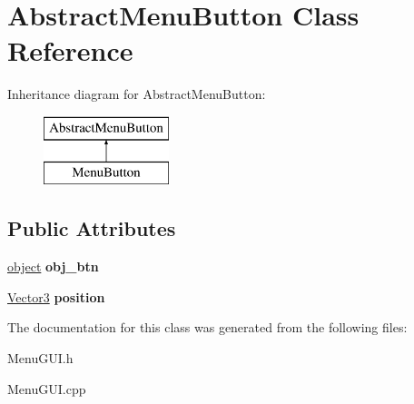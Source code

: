 \hypertarget{class_abstract_menu_button}{\section{Abstract\-Menu\-Button Class Reference}
\label{class_abstract_menu_button}
}
Inheritance diagram for Abstract\-Menu\-Button\-:\begin{figure}[H]
\begin{center}
\leavevmode
\includegraphics[height=2.000000cm]{class_abstract_menu_button}
\end{center}
\end{figure}
\subsection*{Public Attributes}
\begin{DoxyCompactItemize}
\item 
\hypertarget{class_abstract_menu_button_ad1498e6383f0884ac96b0a76cfeee31a}{\hyperlink{structobject}{object} {\bfseries obj\-\_\-btn}}\label{class_abstract_menu_button_ad1498e6383f0884ac96b0a76cfeee31a}

\item 
\hypertarget{class_abstract_menu_button_a86e619f395f94d346bd08b31e234ceb1}{\hyperlink{struct_vector3}{Vector3} {\bfseries position}}\label{class_abstract_menu_button_a86e619f395f94d346bd08b31e234ceb1}

\end{DoxyCompactItemize}


The documentation for this class was generated from the following files\-:\begin{DoxyCompactItemize}
\item 
Menu\-G\-U\-I.\-h\item 
Menu\-G\-U\-I.\-cpp\end{DoxyCompactItemize}
